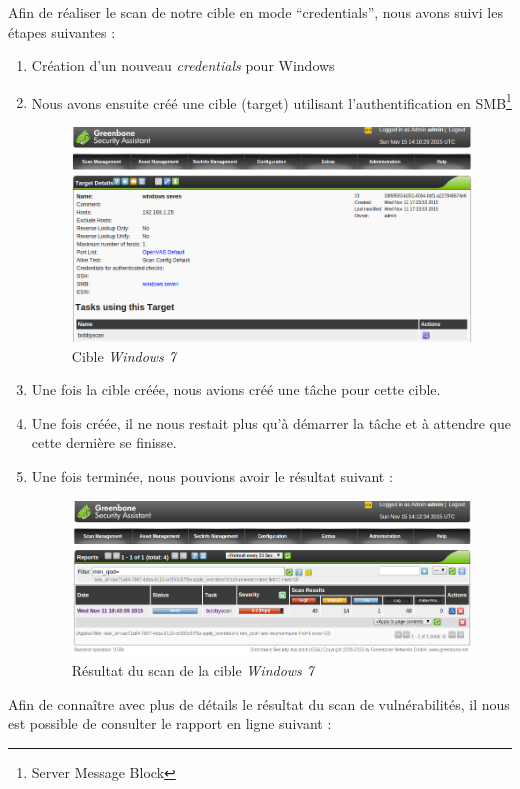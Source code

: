 Afin de réaliser le scan de notre cible en mode \enquote{credentials}, nous avons suivi les étapes suivantes :
\begin{enumerate}
 \item Création d'un nouveau \textit{credentials} pour Windows
 \item Nous avons ensuite créé une cible (target) utilisant l'authentification en SMB\footnote{Server Message Block\cite{SMB}}\\
 \begin{figure}[H]
    \centering
    \includegraphics[width=\textwidth]{img/targetW7.png}
    \caption{Cible \textit{Windows 7}}
 \end{figure}
 \item Une fois la cible créée, nous avions créé une tâche pour cette cible.
 \item Une fois créée, il ne nous restait plus qu'à démarrer la tâche et à attendre que cette dernière se finisse.
 \item Une fois terminée, nous pouvions avoir le résultat suivant :
 \begin{figure}[H]
    \centering
    \includegraphics[width=\textwidth]{img/repW71.png}
    \caption{Résultat du scan de la cible \textit{Windows 7}}
 \end{figure}
\end{enumerate}
Afin de connaître avec plus de détails le résultat du scan de vulnérabilités, il nous est possible de consulter le rapport en ligne suivant :

